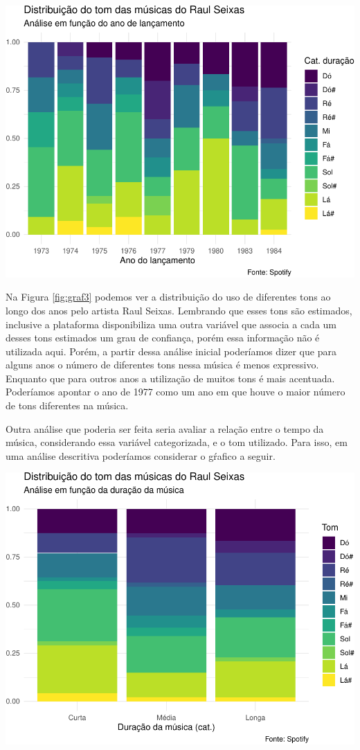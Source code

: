 \documentclass[]{book}
\begin{document}
\begin{center}\includegraphics[width=0.8\linewidth]{notas_livro_files/figure-latex/graf3-1} \end{center}

Na Figura \ref{fig:graf3} podemos ver a distribuição do uso de diferentes tons ao longo dos anos pelo artista Raul Seixas. Lembrando que esses tons são estimados, inclusive a plataforma disponibiliza uma outra variável que associa a cada um desses tons estimados um grau de confiança, porém essa informação não é utilizada aqui. Porém, a partir dessa análise inicial poderíamos dizer que para alguns anos o número de diferentes tons nessa música é menos expressivo. Enquanto que para outros anos a utilização de muitos tons é mais acentuada. Poderíamos apontar o ano de 1977 como um ano em que houve o maior número de tons diferentes na música.

Outra análise que poderia ser feita seria avaliar a relação entre o tempo da música, considerando essa variável categorizada, e o tom utilizado. Para isso, em uma análise descritiva poderíamos considerar o gŕafico a seguir.

\begin{center}\includegraphics[width=0.8\linewidth]{notas_livro_files/figure-latex/graf4-1} \end{center}
\end{document}
